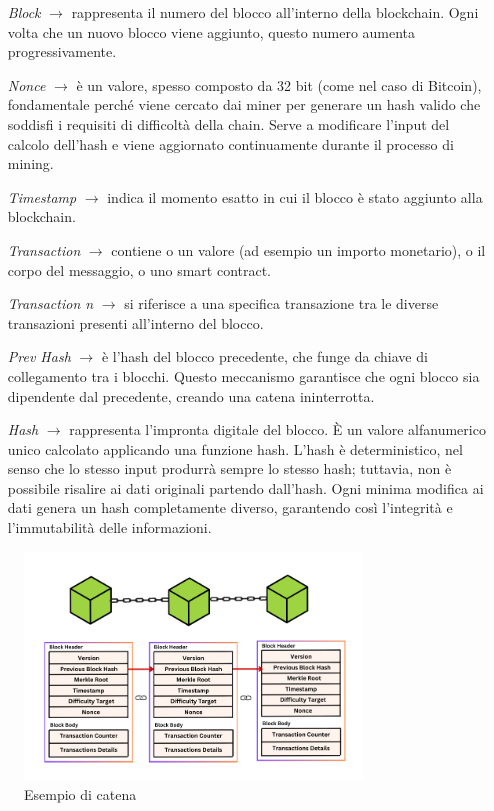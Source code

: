 \begin{adjustwidth}{1cm}{0pt}
    \begin{itemize}
        \item[\textit{Block} $\rightarrow$ ]  rappresenta il numero del blocco all'interno della blockchain. Ogni volta che un nuovo blocco viene aggiunto, questo numero aumenta progressivamente.
        \item[\textit{Nonce} $\rightarrow$ ]  è un valore, spesso composto da 32 bit (come nel caso di Bitcoin), fondamentale perché viene cercato dai miner per generare un hash valido che soddisfi i requisiti di difficoltà della chain. Serve a modificare l’input del calcolo dell’hash e viene aggiornato continuamente durante il processo di mining.
        \item [\textit{Timestamp} $\rightarrow$ ] indica il momento esatto in cui il blocco è stato aggiunto alla blockchain.
        \item [\textit{Transaction} $\rightarrow$ ] contiene o un valore (ad esempio un importo monetario), o il corpo del messaggio, o uno smart contract.
        \item [\textit{Transaction n} $\rightarrow$ ] si riferisce a una specifica transazione tra le diverse transazioni presenti all’interno del blocco.
        \item [\textit{Prev Hash} $\rightarrow$ ] è l’hash del blocco precedente, che funge da chiave di collegamento tra i blocchi. Questo meccanismo garantisce che ogni blocco sia dipendente dal precedente, creando una catena ininterrotta.
        \item [\textit{Hash} $\rightarrow$ ] rappresenta l’impronta digitale del blocco. È un valore alfanumerico unico calcolato applicando una funzione hash. L’hash è deterministico, nel senso che lo stesso input produrrà sempre lo stesso hash; tuttavia, non è possibile risalire ai dati originali partendo dall’hash. Ogni minima modifica ai dati genera un hash completamente diverso, garantendo così l’integrità e l’immutabilità delle informazioni.
    \end{itemize}
\end{adjustwidth}
\begin{figure}[t]
    \centering
    \includegraphics[width=0.8\textwidth]{Immagini/structure of block.png}
    \caption{Esempio di catena}
\end{figure}
